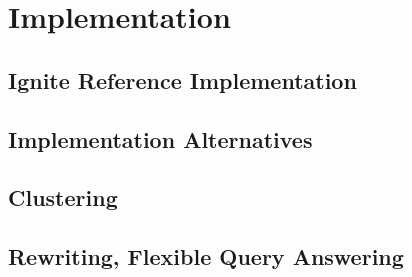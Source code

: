 
\section{Implementation}
\label{sec:impl}


\subsection{Ignite Reference Implementation}
\label{sec:impl_refimpl}

\subsection{Implementation Alternatives}
\label{sec:impl_alter}

\subsection{Clustering}
\label{sec:impl_clust}

\subsection{Rewriting, Flexible Query Answering}
\label{sec:impl_fqa}